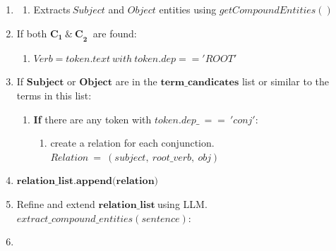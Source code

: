 \setlength{\algomargin}{2em} %
\begin{algorithm}
	\DontPrintSemicolon
	
	\begin{enumerate}
	  \item 
	  			{
	  			\begin{enumerate}
	  				\def\labelenumii{\alph{enumii}.}
	  			\item
	  			 Extracts\(\ Subject\) and \(Object\) entities using
	  			   \(getCompoundEntities()\)
	  			\end{enumerate}
	  			
	  			}\label{endfor}
	  \item 
	  If both
	    \({\mathbf{C}_{\mathbf{1}}\mathbf{\ \&\ C}}_{\mathbf{2}}\mathbf{\ }\)
	    are found:
	    \begin{enumerate}
	    \item
	      \(Verb = token.text\ with\ token.dep = = 'ROOT'\)
	    \end{enumerate}
	   
	  \item
	     If \(\mathbf{Subject}\) or \(\mathbf{Object}\) are in the
	      \(\mathbf{term\_ candicates}\) list or similar to the terms in this
	      list:
	      \begin{enumerate}
	      \item
	        \textbf{If} there are any token with \(token.dep\_\  = = \ 'conj'\):
	      
	        \begin{enumerate}
	        \item
	          create a relation for each conjunction. \(Relation\  = \ (subject,\ root\_ verb,\ obj)\)
	        \end{enumerate}
	      \end{enumerate}
	      	    
	 \item
	   \(\mathbf{relation}\mathbf{\_}\mathbf{list}\mathbf{.}\mathbf{append}\mathbf{(}\mathbf{relation}\mathbf{)}\)
	 \item
	   Refine and extend
	   \(\mathbf{relation}\mathbf{\_}\mathbf{list}\mathbf{\ }\)using LLM. \(extract\_ compound\_ entities(sentence)\):
	   
	   \item
\end{enumerate}
\end{algorithm}
